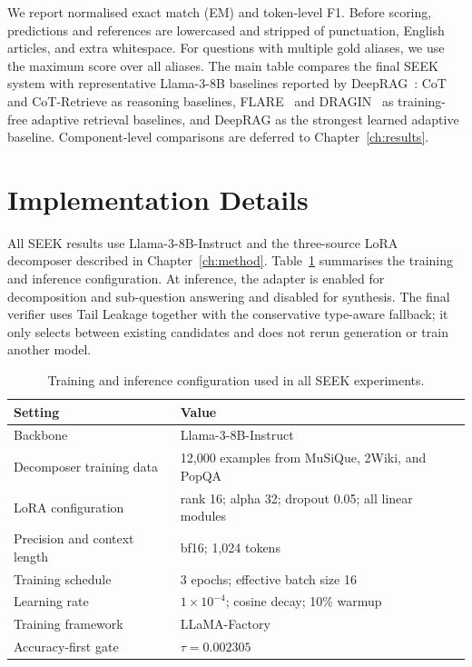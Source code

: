 We report normalised exact match (EM) and token-level F1. Before scoring, predictions and references are lowercased and stripped of punctuation, English articles, and extra whitespace. For questions with multiple gold aliases, we use the maximum score over all aliases. The main table compares the final SEEK system with representative Llama-3-8B baselines reported by DeepRAG~\cite{deeprag}: CoT and CoT-Retrieve as reasoning baselines, FLARE~\cite{flare} and DRAGIN~\cite{dragin} as training-free adaptive retrieval baselines, and DeepRAG as the strongest learned adaptive baseline. Component-level comparisons are deferred to Chapter~\ref{ch:results}.

\section{Implementation Details}

All SEEK results use Llama-3-8B-Instruct and the three-source LoRA decomposer described in Chapter~\ref{ch:method}. Table~\ref{tab:implementation-details} summarises the training and inference configuration. At inference, the adapter is enabled for decomposition and sub-question answering and disabled for synthesis. The final verifier uses Tail Leakage together with the conservative type-aware fallback; it only selects between existing candidates and does not rerun generation or train another model.

\begin{table}[h]
    \centering
    \caption[Implementation Details]{Training and inference configuration used in all SEEK experiments.}
    \label{tab:implementation-details}
    \setlength{\tabcolsep}{8pt}
    \small
    \begin{tabular}{ l l }
        \toprule
        Setting & Value \\
        \midrule
        Backbone & Llama-3-8B-Instruct \\
        Decomposer training data & 12{,}000 examples from MuSiQue, 2Wiki, and PopQA \\
        LoRA configuration & rank 16; alpha 32; dropout 0.05; all linear modules \\
        Precision and context length & bf16; 1{,}024 tokens \\
        Training schedule & 3 epochs; effective batch size 16 \\
        Learning rate & $1\times10^{-4}$; cosine decay; 10\% warmup \\
        Training framework & LLaMA-Factory~\cite{llamafactory} \\
        Accuracy-first gate & $\tau=0.002305$ \\
        \bottomrule
    \end{tabular}
\end{table}


